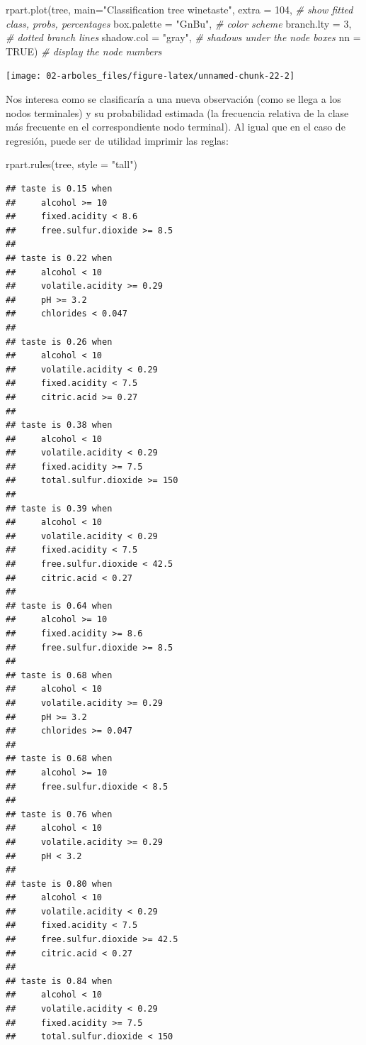\documentclass[
]{book}
\newenvironment{Shaded}{\begin{snugshade}}{\end{snugshade}}
\newcommand{\AttributeTok}[1]{\textcolor[rgb]{0.77,0.63,0.00}{#1}}
\newcommand{\CommentTok}[1]{\textcolor[rgb]{0.56,0.35,0.01}{\textit{#1}}}
\newcommand{\ConstantTok}[1]{\textcolor[rgb]{0.00,0.00,0.00}{#1}}
\newcommand{\DecValTok}[1]{\textcolor[rgb]{0.00,0.00,0.81}{#1}}
\newcommand{\FunctionTok}[1]{\textcolor[rgb]{0.00,0.00,0.00}{#1}}
\newcommand{\NormalTok}[1]{#1}
\newcommand{\StringTok}[1]{\textcolor[rgb]{0.31,0.60,0.02}{#1}}
\theoremstyle{break}
\theoremstyle{definition}
\theoremstyle{definition}
\theoremstyle{definition}
\theoremstyle{definition}
\theoremstyle{remark}
\begin{document}
\begin{Shaded}
\begin{Highlighting}[]
\FunctionTok{rpart.plot}\NormalTok{(tree, }\AttributeTok{main=}\StringTok{"Classification tree winetaste"}\NormalTok{,}
           \AttributeTok{extra =} \DecValTok{104}\NormalTok{,          }\CommentTok{\# show fitted class, probs, percentages}
           \AttributeTok{box.palette =} \StringTok{"GnBu"}\NormalTok{, }\CommentTok{\# color scheme}
           \AttributeTok{branch.lty =} \DecValTok{3}\NormalTok{,       }\CommentTok{\# dotted branch lines}
           \AttributeTok{shadow.col =} \StringTok{"gray"}\NormalTok{,  }\CommentTok{\# shadows under the node boxes}
           \AttributeTok{nn =} \ConstantTok{TRUE}\NormalTok{)            }\CommentTok{\# display the node numbers }
\end{Highlighting}
\end{Shaded}

\begin{center}\texttt{[image: 02-arboles\_files/figure-latex/unnamed-chunk-22-2]} \end{center}

Nos interesa como se clasificaría a una nueva observación (como se llega a los nodos terminales) y su probabilidad estimada (la frecuencia relativa de la clase más frecuente en el correspondiente nodo terminal).
Al igual que en el caso de regresión, puede ser de utilidad imprimir las reglas:

\begin{Shaded}
\begin{Highlighting}[]
\FunctionTok{rpart.rules}\NormalTok{(tree, }\AttributeTok{style =} \StringTok{"tall"}\NormalTok{)}
\end{Highlighting}
\end{Shaded}

\begin{verbatim}
## taste is 0.15 when
##     alcohol >= 10
##     fixed.acidity < 8.6
##     free.sulfur.dioxide >= 8.5
## 
## taste is 0.22 when
##     alcohol < 10
##     volatile.acidity >= 0.29
##     pH >= 3.2
##     chlorides < 0.047
## 
## taste is 0.26 when
##     alcohol < 10
##     volatile.acidity < 0.29
##     fixed.acidity < 7.5
##     citric.acid >= 0.27
## 
## taste is 0.38 when
##     alcohol < 10
##     volatile.acidity < 0.29
##     fixed.acidity >= 7.5
##     total.sulfur.dioxide >= 150
## 
## taste is 0.39 when
##     alcohol < 10
##     volatile.acidity < 0.29
##     fixed.acidity < 7.5
##     free.sulfur.dioxide < 42.5
##     citric.acid < 0.27
## 
## taste is 0.64 when
##     alcohol >= 10
##     fixed.acidity >= 8.6
##     free.sulfur.dioxide >= 8.5
## 
## taste is 0.68 when
##     alcohol < 10
##     volatile.acidity >= 0.29
##     pH >= 3.2
##     chlorides >= 0.047
## 
## taste is 0.68 when
##     alcohol >= 10
##     free.sulfur.dioxide < 8.5
## 
## taste is 0.76 when
##     alcohol < 10
##     volatile.acidity >= 0.29
##     pH < 3.2
## 
## taste is 0.80 when
##     alcohol < 10
##     volatile.acidity < 0.29
##     fixed.acidity < 7.5
##     free.sulfur.dioxide >= 42.5
##     citric.acid < 0.27
## 
## taste is 0.84 when
##     alcohol < 10
##     volatile.acidity < 0.29
##     fixed.acidity >= 7.5
##     total.sulfur.dioxide < 150
\end{verbatim}
\end{document}

